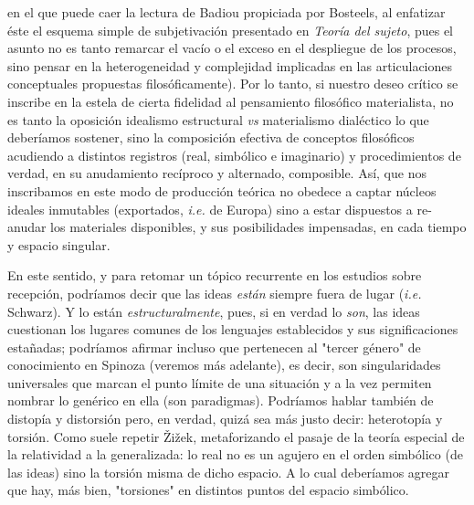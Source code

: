 en el que puede caer la lectura de Badiou propiciada por Bosteels, al
enfatizar éste el esquema simple de subjetivación presentado en
\emph{Teoría del sujeto}, pues el asunto no es tanto remarcar el vacío o
el exceso en el despliegue de los procesos, sino pensar en la
heterogeneidad y complejidad implicadas en las articulaciones
conceptuales propuestas filosóficamente). Por lo tanto, si nuestro deseo
crítico se inscribe en la estela de cierta fidelidad al pensamiento
filosófico materialista, no es tanto la oposición idealismo estructural
\emph{vs} materialismo dialéctico lo que deberíamos sostener, sino la
composición efectiva de conceptos filosóficos acudiendo a distintos
registros (real, simbólico e imaginario) y procedimientos de verdad, en
su anudamiento recíproco y alternado, composible. Así, que nos
inscribamos en este modo de producción teórica no obedece a captar
núcleos ideales inmutables (exportados, \emph{i.e.} de Europa) sino a
estar dispuestos a re-anudar los materiales disponibles, y sus
posibilidades impensadas, en cada tiempo y espacio singular.

En este sentido, y para retomar un tópico recurrente en los estudios
sobre recepción, podríamos decir que las ideas \emph{están} siempre
fuera de lugar (\emph{i.e.} Schwarz). Y lo están
\emph{estructuralmente}, pues, si en verdad lo \emph{son}, las ideas
cuestionan los lugares comunes de los lenguajes establecidos y sus
significaciones estañadas; podríamos afirmar incluso que pertenecen al
"tercer género" de conocimiento en Spinoza (veremos más adelante), es
decir, son singularidades universales que marcan el punto límite de una
situación y a la vez permiten nombrar lo genérico en ella (son
paradigmas). Podríamos hablar también de distopía y distorsión pero, en
verdad, quizá sea más justo decir: heterotopía y torsión. Como suele
repetir Žižek, metaforizando el pasaje de la teoría especial de la
relatividad a la generalizada: lo real no es un agujero en el orden
simbólico (de las ideas) sino la torsión misma de dicho espacio. A lo
cual deberíamos agregar que hay, más bien, "torsiones" en distintos
puntos del espacio simbólico.

